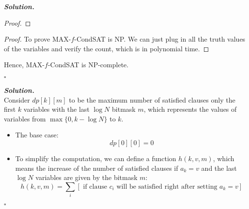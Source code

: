 \documentclass[12pt, a4paper, UTF8]{article}
\newenvironment{solution}[1][\it{Solution}]{\textbf{#1. }\\}{\begin{flushright}$\square$\end{flushright}}
\begin{document}
\begin{subprobs}
\begin{subprobs}
\begin{solution}
\begin{proof}
        \end{proof}
        \begin{proof} To prove MAX-$f$-CondSAT is NP.
            We can just plug in all the truth values of the variables and verify the count, which is in polynomial time.
        \end{proof}
        Hence, MAX-$f$-CondSAT is NP-complete.
    \end{solution}
\item
    \begin{solution}
        Consider $dp[k][m]$ to be the maximum number of satisfied clauses only the first $k$ variables with the last $\log{N}$ bitmask $m$, which represents the values of variables from $\max\{0, k - \log{N}\}$ to $k$.\\
        \begin{itemize}
            \item The base case: 
                $$dp[0][0] = 0$$
            \item To simplify the computation, we can define a function $h(k, v, m)$, which means the increase of the number of satisfied clauses if $a_k = v$ and the last $\log{N}$ variables are given by the bitmask $m$:
                $$h(k, v, m) = \sum_i [\text{ if clause } c_i \text{ will be satisfied right after setting } a_k = v ]$$
            

\end{itemize}
\end{solution}
\end{subprobs}
\end{subprobs}
\end{document}

